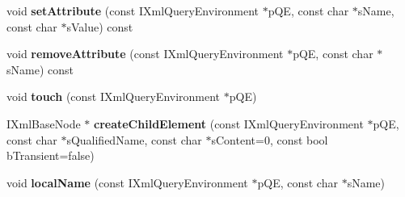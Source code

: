 \begin{DoxyCompactItemize}
\item 
\hypertarget{classgeneral__server_1_1LibXmlBaseNode_a6d01290abcba37e3573250d847e6095d}{void {\bfseries set\-Attribute} (const \-I\-Xml\-Query\-Environment $\ast$p\-Q\-E, const char $\ast$s\-Name, const char $\ast$s\-Value) const }\label{classgeneral__server_1_1LibXmlBaseNode_a6d01290abcba37e3573250d847e6095d}

\item 
\hypertarget{classgeneral__server_1_1LibXmlBaseNode_ac7820801f2537d89b9a24e41696b6b96}{void {\bfseries remove\-Attribute} (const \-I\-Xml\-Query\-Environment $\ast$p\-Q\-E, const char $\ast$s\-Name) const }\label{classgeneral__server_1_1LibXmlBaseNode_ac7820801f2537d89b9a24e41696b6b96}

\item 
\hypertarget{classgeneral__server_1_1LibXmlBaseNode_a7ea349557a37893c6fae6963a1e15f9a}{void {\bfseries touch} (const \-I\-Xml\-Query\-Environment $\ast$p\-Q\-E)}\label{classgeneral__server_1_1LibXmlBaseNode_a7ea349557a37893c6fae6963a1e15f9a}

\item 
\hypertarget{classgeneral__server_1_1LibXmlBaseNode_ab76ccece0ef1031c7fe0e6dd5981f957}{\-I\-Xml\-Base\-Node $\ast$ {\bfseries create\-Child\-Element} (const \-I\-Xml\-Query\-Environment $\ast$p\-Q\-E, const char $\ast$s\-Qualified\-Name, const char $\ast$s\-Content=0, const bool b\-Transient=false)}\label{classgeneral__server_1_1LibXmlBaseNode_ab76ccece0ef1031c7fe0e6dd5981f957}

\item 
\hypertarget{classgeneral__server_1_1LibXmlBaseNode_aad16fc7abc5e4e37a8587c2254f0ab90}{void {\bfseries local\-Name} (const \-I\-Xml\-Query\-Environment $\ast$p\-Q\-E, const char $\ast$s\-Name)}\label{classgeneral__server_1_1LibXmlBaseNode_aad16fc7abc5e4e37a8587c2254f0ab90}

\end{DoxyCompactItemize}
